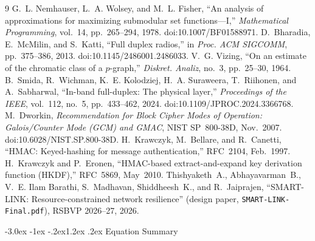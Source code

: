 \documentclass[10pt,a4paper]{article}
\makeatletter
\renewcommand\section{\@startsection{section}{1}{\z@}%
  {-3.0ex \@plus -1ex \@minus -.2ex}{1.2ex \@plus .2ex}%
  {\normalfont\large\bfseries}}
\makeatother
\begin{document}
\clearpage
\begingroup
\renewcommand\refname{References}
\small
\begin{thebibliography}{9}\setlength\itemsep{1pt}
 G.~L. Nemhauser, L.~A. Wolsey, and M.~L. Fisher, ``An analysis of approximations for maximizing submodular
  set functions---I,'' \emph{Mathematical Programming}, vol.~14, pp.~265--294, 1978. doi:10.1007/BF01588971.
 D.~Bharadia, E.~McMilin, and S.~Katti, ``Full duplex radios,'' in \emph{Proc. ACM SIGCOMM}, pp.~375--386, 2013.
  doi:10.1145/2486001.2486033.
 V.~G. Vizing, ``On an estimate of the chromatic class of a $p$-graph,'' \emph{Diskret. Analiz}, no.~3, pp.~25--30, 1964.
 B.~Smida, R.~Wichman, K.~E. Kolodziej, H.~A. Suraweera, T.~Riihonen, and A.~Sabharwal, ``In-band full-duplex: The
  physical layer,'' \emph{Proceedings of the IEEE}, vol.~112, no.~5, pp.~433--462, 2024. doi:10.1109/JPROC.2024.3366768.
 M.~Dworkin, \emph{Recommendation for Block Cipher Modes of Operation: Galois/Counter Mode (GCM) and GMAC}, NIST
  SP~800-38D, Nov.~2007. doi:10.6028/NIST.SP.800-38D.
 H.~Krawczyk, M.~Bellare, and R.~Canetti, ``HMAC: Keyed-hashing for message authentication,'' RFC~2104, Feb.~1997.
 H.~Krawczyk and P.~Eronen, ``HMAC-based extract-and-expand key derivation function (HKDF),'' RFC~5869, May~2010.
 Thishyaketh~A., Abhayavarman~B., V.~E. Ilam Barathi, S.~Madhavan, Shiddheesh~K., and R.~Jaiprajen,
  ``SMART-LINK: Resource-constrained network resilience'' (design paper, \texttt{SMART-LINK-Final.pdf}), RSBVP 2026--27, 2026.
\end{thebibliography}
\endgroup

\appendix
\section{Equation Summary}\label{app:eqs}
\end{document}
